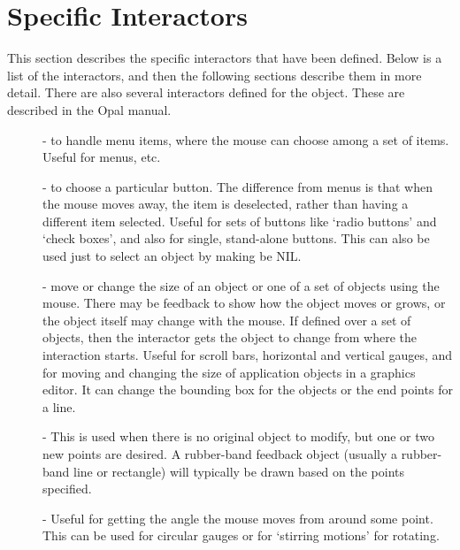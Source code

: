 \chapter{Specific Interactors}
\label{specificinters}

This section describes the specific interactors that have been defined.
Below is a list of the interactors, and then the following sections
describe them in more detail.  There are also several interactors defined for
the  object.  These are described in the Opal manual.

\begin{description}
\item[]  
- to handle menu items, where the mouse can choose
among a set of items.  Useful for menus, etc.

\item[]  
- to choose a particular button.  The difference
from menus is that when the mouse moves away, the item is deselected,
rather than having a different item selected.  Useful for sets of buttons
like `radio buttons' and `check boxes', and also for single, stand-alone buttons.
This can also be used just to select an object by making
 be NIL.

\item[]  
- move or change the size of
an object or one of a set of objects using the mouse.
There may be feedback to show how the object moves or grows, or the
object itself may
change with the mouse.  If defined over a set of objects, then the
interactor gets the
object to change from where the interaction starts.  Useful for scroll
bars, horizontal and vertical gauges, and for moving and changing
the size of application objects in a graphics editor.  It can change the
bounding box for the objects or the end points for a line.

\item[]  
- This is used when there is no original object to
modify, but one or two new points are desired.
A rubber-band feedback object (usually a
rubber-band line or rectangle) will typically be
drawn based on the points specified.

\item[]  
- Useful for getting the angle the mouse moves from
around some point.  This can be used for circular gauges or for `stirring
motions' for rotating.


\end{description}

